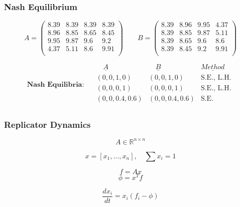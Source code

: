 \begin{frame}
    \frametitle{Nash Equilibrium}
    \centering

    \small
    \begin{equation*}
        A = 
        \begin{pmatrix}
            8.39 & 8.39 & 8.39 & 8.39 \\
            8.96 & 8.85 & 8.65 & 8.45 \\
            9.95 & 9.87 & 9.6  & 9.2  \\
            4.37 & 5.11 & 8.6  & 9.91 \\
        \end{pmatrix} \qquad
        B = 
        \begin{pmatrix}
            8.39 & 8.96 & 9.95 & 4.37 \\
            8.39 & 8.85 & 9.87 & 5.11 \\
            8.39 & 8.65 & 9.6 &  8.6 \\ 
            8.39 & 8.45 & 9.2 &  9.91 \\
        \end{pmatrix}
    \end{equation*}

    \vspace{1cm}

    \begin{equation*}
        \textbf{Nash Equilibria: } \quad
        \begin{array}{c|c||c}
            \underline{\quad A \quad} & \underline{\quad B \quad} & \underline{Method} \\
            (0, 0, 1, 0) & (0, 0, 1, 0) & \text{S.E., L.H.}\\ 
            \hline
            (0, 0, 0, 1) & (0, 0, 0, 1) & \text{S.E., L.H.}\\ 
            \hline
            (0, 0, 0.4, 0.6) & (0, 0, 0.4, 0.6) & \text{S.E.}\\
        \end{array}
    \end{equation*}
\end{frame}


\begin{frame}
    \frametitle{Replicator Dynamics}
    \centering

    \[
        A \in \mathbb{R}^{n \times n}
    \]

    \[
        x = [x_1, \dots, x_n], \quad \sum{x_i} = 1
    \]

    \[
        f = A x
    \]
    \vspace{-0.8cm}
    \[  
        \phi = x^T f
    \]

    \[
        \frac{dx_i}{dt} = x_i(f_i - \phi)
    \]
    
\end{frame}


